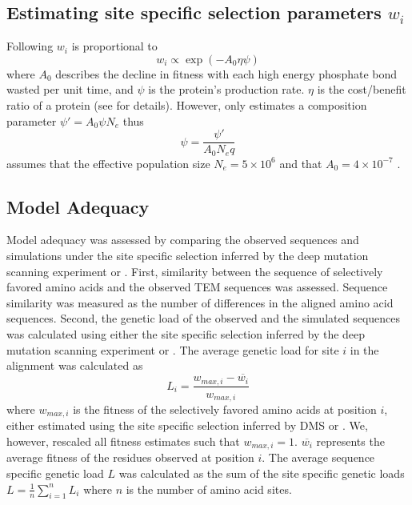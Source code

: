 \documentclass[12pt]{article}
\begin{document}
\subsection{Estimating site specific selection parameters $w_i$}

Following \citet{beaulieu2019} $w_i$ is proportional to
\begin{equation}
w_i \propto \exp(-A_0\eta\psi)
\end{equation}
where $A_0$ describes the decline in fitness with each high energy phosphate bond wasted per unit time, and $\psi$ is the protein's production rate.
$\eta$ is the cost/benefit ratio of a protein (see \citep{beaulieu2019} for details). 
However, \selac only estimates a composition parameter $\psi' = A_0\psi N_e$ thus
\begin{equation}
\psi = \frac{\psi'}{A_0N_eq}
\end{equation}
\selac assumes that the effective population size $N_e = 5\times 10^6$ and that $A_0 = 4 \times 10^{-7}$ \citep{gilchrist2007}.

\subsection{Model Adequacy}

Model adequacy was assessed by comparing the observed sequences and simulations under the site specific selection inferred by the deep mutation scanning experiment or \selac.
First, similarity between the sequence of selectively favored amino acids and the observed TEM sequences was assessed.
Sequence similarity was measured as the number of differences in the aligned amino acid sequences.
Second, the genetic load of the observed and the simulated sequences was calculated using either the site specific selection inferred by the deep mutation scanning experiment or \selac.
The average genetic load for site $i$ in the alignment was calculated as
\begin{equation}
L_i = \frac{w_{max,i} - \overline{w_i}}{w_{max,i}}
\end{equation}
where $w_{max,i}$ is the fitness of the selectively favored amino acids at position $i$, either estimated using the site specific selection inferred by DMS or \selac.
We, however, rescaled all fitness estimates such that $w_{max,i} = 1$.
$\overline{w_i}$ represents the average fitness of the residues observed at position $i$.
The average sequence specific genetic load $L$ was calculated as the sum of the site specific genetic loads $L = \frac{1}{n}\sum_{i=1}^n L_i$ where $n$ is the number of amino acid sites.
\end{document}
